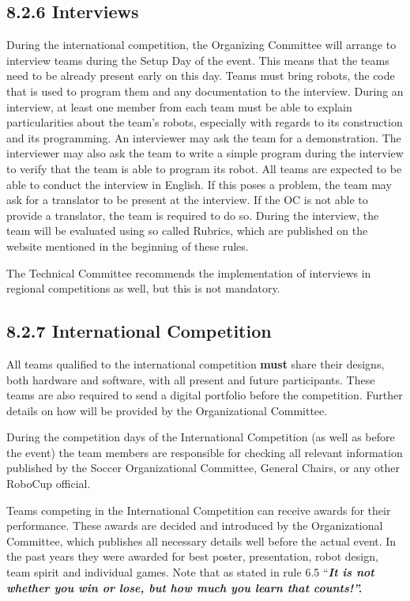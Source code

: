\documentclass{article}
\begin{document}
\subsection{8.2.6 Interviews \label{ref-060}}

During the international competition, the Organizing Committee will arrange to interview teams during the Setup Day of the event. This means that the teams need to be already present early on this day. Teams must bring robots, the code that is used to program them and any documentation to the interview. During an interview, at least one member from each team must be able to explain particularities about the team's robots, especially with regards to its construction and its programming. An interviewer may ask the team for a demonstration. The interviewer may also ask the team to write a simple program during the interview to verify that the team is able to program its robot. All teams are expected to be able to conduct the interview in English. If this poses a problem, the team may ask for a translator to be present at the interview. If the OC is not able to provide a translator, the team is required to do so. During the interview, the team will be evaluated using so called Rubrics, which are published on the website mentioned in the beginning of these rules.

The Technical Committee recommends the implementation of interviews in regional competitions as well, but this is not mandatory.

\subsection{8.2.7 International Competition \label{ref-061}}

All teams qualified to the international competition \textbf{must} share their designs, both hardware and software, with all present and future participants. These teams are also required to send a digital portfolio before the competition. Further details on how will be provided by the Organizational Committee.

During the competition days of the International Competition (as well as before the event) the team members are responsible for checking all relevant information published by the Soccer Organizational Committee, General Chairs, or any other RoboCup official.

Teams competing in the International Competition can receive awards for their performance. These awards are decided and introduced by the Organizational Committee, which publishes all necessary details well before the actual event. In the past years they were awarded for best poster, presentation, robot design, team spirit and individual games. Note that as stated in rule 6.5 ``\textbf{\textit{\textcolor{color-5}{It is not whether you win or lose, but how much you learn that counts!''.}}}
\end{document}
